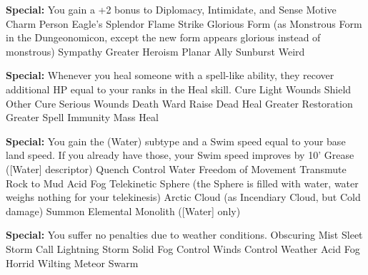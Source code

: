 \begin{multicols}{2}
\textbf{Special: }{You gain a +2 bonus to Diplomacy, Intimidate, and Sense Motive}
\sphere
{Charm Person}
{Eagle's Splendor}
{Flame Strike}
{Glorious Form (as Monstrous Form in the Dungeonomicon, except the new form appears glorious instead of monstrous)}
{Sympathy}
{Greater Heroism}
{Planar Ally}
{Sunburst}
{Weird}

\textbf{Special: }{Whenever you heal someone with a spell-like ability, they recover additional HP equal to your ranks in the Heal skill.}
\sphere
{Cure Light Wounds}
{Shield Other}
{Cure Serious Wounds}
{Death Ward}
{Raise Dead}
{Heal}
{Greater Restoration}
{Greater Spell Immunity}
{Mass Heal}

\textbf{Special: }{You gain the (Water) subtype and a Swim speed equal to your base land speed. If you already have those, your Swim speed improves by 10'}
\sphere
{Grease ([Water] descriptor)}
{Quench}
{Control Water}
{Freedom of Movement}
{Transmute Rock to Mud}
{Acid Fog}
{Telekinetic Sphere (the Sphere is filled with water, water weighs nothing for your telekinesis)}
{Arctic Cloud (as Incendiary Cloud, but Cold damage)}
{Summon Elemental Monolith ([Water] only)}

\textbf{Special: }{You suffer no penalties due to weather conditions.}
\sphere
{Obscuring Mist}
{Sleet Storm}
{Call Lightning Storm}
{Solid Fog}
{Control Winds}
{Control Weather}
{Acid Fog}
{Horrid Wilting}
{Meteor Swarm}








\end{multicols}